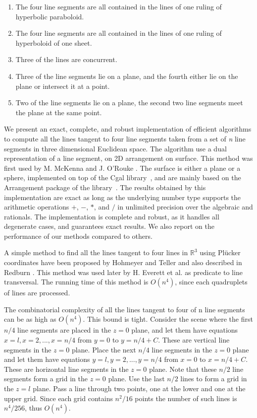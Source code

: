 \documentclass[11pt]{article}
\newcommand{\cgal}{{\sc Cgal}}
\begin{document}
\begin{enumerate}
\item
The four line segments are all contained in the lines of one ruling of
hyperbolic paraboloid.
\item
The four line segments are all contained in the lines of one ruling of
hyperboloid of one sheet.
\item
Three of the lines are concurrent.
\item
Three of the line segments lie on a plane, and the fourth either lie on the 
plane or intersect it at a point.
\item
Two of the line segments lie on a plane, the second two line segments meet the
plane at the same point.
\end{enumerate}

We present an exact, complete, and robust implementation of efficient
algorithms to compute all the lines tangent to four line segments taken from a
set of \textit{n} line segments in three dimensional Euclidean space.
The algorithm use a dual representation of a line segment, on 2D arrangement
on surface. This method was first used by M. McKenna and J. O'Rouke 
\cite{73431}. The surface is either a plane or a sphere, implemented on top of 
the \cgal{} library~\cite{cgal-home}, and are mainly based on the Arrangement
package of the library~\cite{fwh-cfpeg-04,wfzh-aptaca-05}. The results obtained
by this implementation are exact as long as the underlying number
type supports the arithmetic operations $+$, $-$, $*$, and $/$ in
unlimited precision over the algebraic and rationals. The implementation is 
complete and robust, as it handles all degenerate cases, and guarantees exact
results. We also report on the performance of our methods compared to others.

A simple method to find all the lines tangent to four lines in $\mathbb{R}^3$
using Pl\"ucker coordinates have been proposed by Hohmeyer and Teller 
\cite{TellerHohmeyer99} and also described in Redburn \cite{J-Redburn-03}. 
This method was used later by H. Everett et al. \cite{Everett08onthe} as 
predicate to line transversal.
The running time of this method is $O(n^4)$, since each quadruplets of lines
are processed.

The combinatorial complexity of all the lines tangent to four of n line
segments can be as high as $O(n^4)$. This bound is tight.
Consider the scene where the first $n / 4$ line segments are placed in the
$z = 0$ plane, and let them have equations $x = l , x=2,..., x = n/4$ from
$y = 0$ to $y = n / 4 + C$. These are vertical line segments in the $z = 0$ 
plane. Place the next $n / 4$ line segments in the $z = 0$ plane and let them
have equations $y = l, y=2,..., y = n / 4$ from $x = 0$ to $x = n / 4 + C$.
These are horizontal line segments in the $z = 0$ plane. Note that these 
$n / 2$ line segments form a grid in the $z = 0$ plane. Use the last 
$n / 2$ lines to form a grid in the $z = l$ plane. Pass a line through two 
points, one at the lower and one at the upper grid. Since each grid contains 
$n^2/16$ points the number of such lines is $n^4/256$, thus $O(n^4)$.
\end{document}
